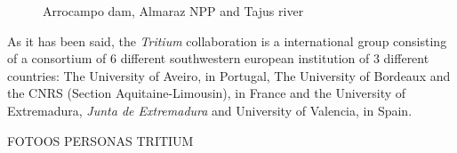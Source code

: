 \begin{figure}[]
 \centering
 \caption{Arrocampo dam, Almaraz NPP and Tajus river}
 \label{fig:Arrocampo}
\end{figure}

As it has been said, the \textit{Tritium} collaboration is a international group consisting of a consortium of 6 different southwestern european institution of 3 different countries: The University of Aveiro, in Portugal, The University of Bordeaux and the CNRS  (Section Aquitaine-Limousin), in France and the University of Extremadura, \textit{Junta de Extremadura} and University of Valencia, in Spain.

FOTOOS PERSONAS TRITIUM

